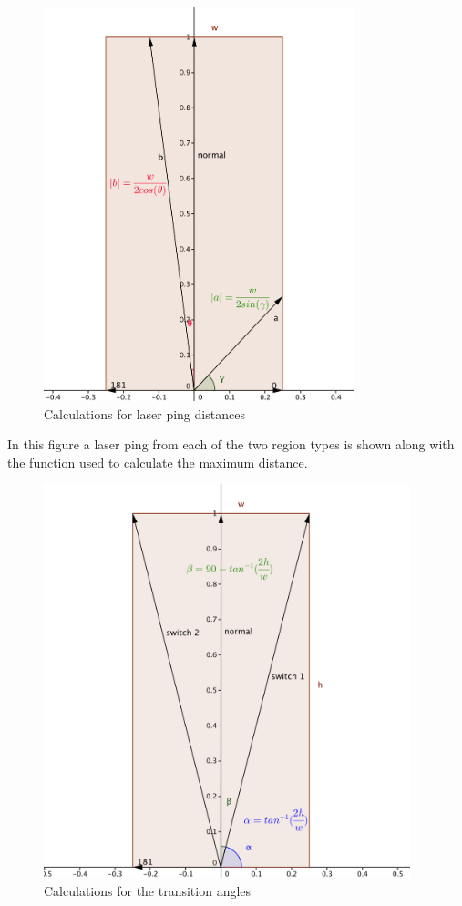 \FloatBarrier
\begin{figure}[h]
  \centering
  \includegraphics[height=4.5in]{Look_Ahead_Bounding_Box.png}
  \caption{Calculations for laser ping distances}
\end{figure}
\FloatBarrier

In this figure a laser ping from each of the two region types is shown
along with the function used to calculate the maximum distance.

\FloatBarrier
\begin{figure}[h]
  \centering
  \includegraphics[height=4.5in]{look_ahead_bounding_box_transitions.png}
  \caption{Calculations for the transition angles}
\end{figure}
\FloatBarrier

